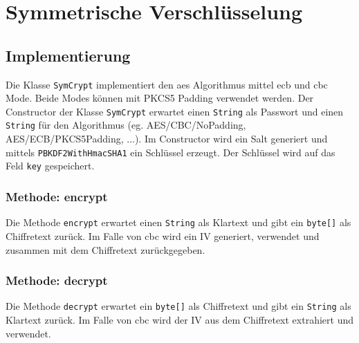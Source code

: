 \chapter{Symmetrische Verschlüsselung}

\section{Implementierung}
Die Klasse \texttt{SymCrypt} implementiert den \gls{aes} Algorithmus mittel \gls{ecb} und \gls{cbc} Mode. Beide Modes können mit PKCS5 Padding verwendet werden. Der Constructor der Klasse \texttt{SymCrypt} erwartet einen \texttt{String} als Passwort und einen \texttt{String} für den Algorithmus (eg. \glqq AES/CBC/NoPadding\grqq, \glqq AES/ECB/PKCS5Padding\grqq , ...).
Im Constructor wird ein Salt generiert und mittels \texttt{PBKDF2WithHmacSHA1} ein Schlüssel erzeugt. Der Schlüssel wird auf das Feld \texttt{key} gespeichert.

\subsection{Methode: encrypt}
Die Methode \texttt{encrypt} erwartet einen \texttt{String} als Klartext und gibt ein \texttt{byte[]} als Chiffretext zurück. Im Falle von \gls{cbc} wird ein IV generiert, verwendet und zusammen mit dem Chiffretext zurückgegeben.

\subsection{Methode: decrypt}
Die Methode \texttt{decrypt} erwartet ein \texttt{byte[]} als Chiffretext und gibt ein \texttt{String} als Klartext zurück. Im Falle von \gls{cbc} wird der IV aus dem Chiffretext extrahiert und verwendet.
